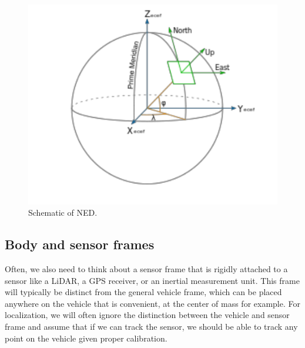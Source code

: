 \begin{figure}[!htb]
\begin{center}
\includegraphics[scale=0.290]{img/coordinate_transforms/ref_frame_3.jpeg}
\end{center}
\caption{Schematic of NED.}
\label{ref_frame_3}
\end{figure}


\subsection{Body and sensor frames}

Often, we also need to think about a sensor frame that is rigidly
attached to a sensor like a LiDAR, a GPS receiver, or
an inertial measurement unit. This frame will typically be distinct
from the general vehicle frame, which can be placed anywhere on
the vehicle that is convenient, at the center of mass for example. For localization, we will often
ignore the distinction between the vehicle and sensor frame and assume
that if we can track the sensor, we should be able to track any point on the vehicle given proper calibration. 


